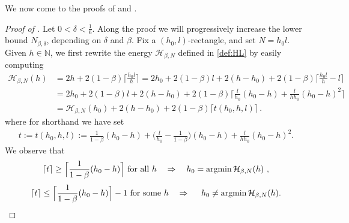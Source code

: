 \documentclass[reqno]{amsart}
\theoremstyle{plain}
\theoremstyle{definition}
\numberwithin{equation}{section}
\newcommand{\N}{\mathbb{N}}
\newcommand{\defas}{:=}
\begin{document}
We now come to the proofs of  and .
\begin{proof}[Proof of ]
Let $0<\delta<\frac{1}{6}$. Along the proof we will progressively 
increase the  lower bound $ N_{\beta,\delta} $, depending on $\delta$ and $\beta$. 
 Fix a  $(h_0,l)$-rectangle, and set $N = h_0l$.   Given $h
\in \N$, we first rewrite the energy $\mathcal{H}_{\beta,N}$ defined
in \eqref{def:HL}   by   easily computing    
\begin{align*}
 \mathcal{H}_{\beta,N}(h) & = 2 h  + 2(1-\beta)   \Big\lceil \frac{h_0 l }{h} \Big\rceil =  2h_0 + 2(1-\beta)  l + 2(h-h_0) +  2(1-\beta)   \Big\lceil \frac{h_0 l }{h} - l \Big\rceil  \\
 & =   2h_0 +  2(1-\beta)  l + 2(h-h_0) + 2(1-\beta)   \Big\lceil \frac{l }{h_0}(h_0-h) + \frac{l}{h h_0} (h_0-h)^2 \Big\rceil\\ 
  & =   \mathcal{H}_{\beta,N}(h_0)   + 2(h-h_0) +  2(1-\beta)   \big\lceil   t(h_0,h,l)  \big\rceil\,. 
\end{align*}
 where for shorthand we have  set 
\begin{align}\label{t-def}
t \defas t(h_0,h,l) \defas   \frac{1}{1-\beta }    (h_0-h)  + \Big(   \frac{l }{h_0} -  \frac{1}{1-\beta }     \Big) (h_0-h)   + \frac{l}{h h_0} (h_0-h)^2  . 
\end{align}
We observe that 
\begin{align}\label{show1}
\lceil t \rceil \ge   \Big\lceil  \frac{1}{1-\beta }    (h_0-h)\Big\rceil \text{ for all $h$}   \quad \Rightarrow  \quad \text{$h_0 = {\rm argmin}\, \mathcal{H}_{\beta,N} (h)$ },
\end{align}
\begin{align}\label{show2}
\lceil t \rceil \le  \Big \lceil  \frac{1}{1-\beta }   (h_0-h)\Big\rceil-1  \text{ for some $h$}   \quad \Rightarrow  \quad \text{ $h_0 \neq {\rm argmin}\,  \mathcal{H}_{\beta,N} (h)$.}
\end{align}


\end{proof}
\end{document}
